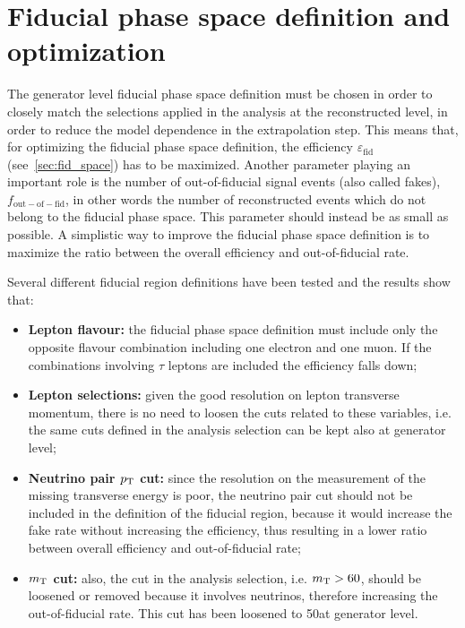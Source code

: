 \chapter{Fiducial phase space definition and optimization}\label{app:fiducial_region}
\thispagestyle{empty}
	
The generator level fiducial phase space definition must be chosen in order to closely match the selections applied in the analysis at the reconstructed level, in order to reduce the model dependence in the extrapolation step. This means that, for optimizing the fiducial phase space definition, the efficiency $\varepsilon_\mathrm{fid}$ (see~\ref{sec:fid_space}) has to be maximized. Another parameter playing an important role is the number of out-of-fiducial signal events (also called fakes), $f_\mathrm{out-of-fid}$, in other words the number of reconstructed events which do not belong to the fiducial phase space. This parameter should instead be as small as possible. A simplistic way to improve the fiducial phase space definition is to maximize the ratio between the overall efficiency and out-of-fiducial rate.

Several different fiducial region definitions have been tested and the results show that:
\begin{itemize}
\item {\bf Lepton flavour:} the fiducial phase space definition must include only the opposite flavour combination including one electron and one muon. If the combinations involving $\tau$ leptons are included the efficiency falls down;
\item {\bf Lepton selections:} given the good resolution on lepton transverse momentum, there is no need to loosen the cuts related to these variables, i.e. the same cuts defined in the analysis selection can be kept also at generator level;
\item {\bf Neutrino pair \boldmath$p_\mathrm{T}$ cut:} since the resolution on the measurement of the missing transverse energy is poor, the neutrino pair cut should not be included in the definition of the fiducial region, because it would increase the fake rate without increasing the efficiency, thus resulting in a lower ratio between overall efficiency and out-of-fiducial rate;
\item {\bf \boldmath$m_\mathrm{T}$ cut:} also, the \mt cut in the analysis selection, i.e. $m_\mathrm{T}>60$\GeV, should be loosened or removed because it involves neutrinos, therefore increasing the out-of-fiducial rate. This cut has been loosened to 50\GeV at generator level.
\end{itemize}

